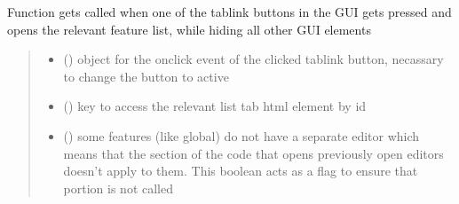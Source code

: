 \documentclass[letterpaper,10pt,english]{sphinxmanual}
\begin{document}
\begin{fulllineitems}
\label{\detokenize{docs_gui/js_api/urbs_editor/generate_urbs_setup_editor:openUrbsEditorList}}
\pysigstartsignatures
{}
\pysigstopsignatures
\sphinxAtStartPar
Function gets called when one of the tablink buttons in the GUI gets pressed and opens the relevant feature list, while hiding all other GUI elements
\begin{quote}\begin{description}
\begin{itemize}
\item {} 
\sphinxAtStartPar
{} () \textendash{} object for the onclick event of the clicked tablink button, necassary to change the button to active

\item {} 
\sphinxAtStartPar
{} () \textendash{} key to access the relevant list tab html element by id

\item {} 
\sphinxAtStartPar
{} () \textendash{} some features (like global) do not have a separate editor which means that the section of the code that opens previously open editors doesn’t apply to them. This boolean acts as a flag to ensure that portion is not called

\end{itemize}

\end{description}\end{quote}

\end{fulllineitems}

\end{document}
